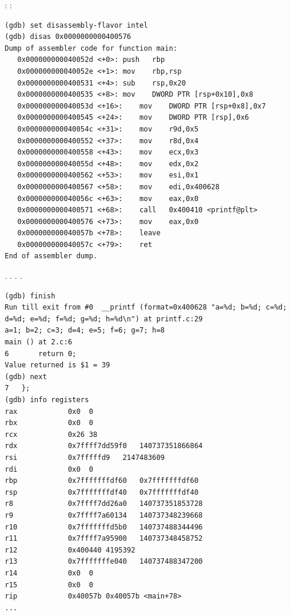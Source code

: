 %
:
:

\begin{lstlisting}
(gdb) set disassembly-flavor intel
(gdb) disas 0x0000000000400576
Dump of assembler code for function main:
   0x000000000040052d <+0>:	push   rbp
   0x000000000040052e <+1>:	mov    rbp,rsp
   0x0000000000400531 <+4>:	sub    rsp,0x20
   0x0000000000400535 <+8>:	mov    DWORD PTR [rsp+0x10],0x8
   0x000000000040053d <+16>:	mov    DWORD PTR [rsp+0x8],0x7
   0x0000000000400545 <+24>:	mov    DWORD PTR [rsp],0x6
   0x000000000040054c <+31>:	mov    r9d,0x5
   0x0000000000400552 <+37>:	mov    r8d,0x4
   0x0000000000400558 <+43>:	mov    ecx,0x3
   0x000000000040055d <+48>:	mov    edx,0x2
   0x0000000000400562 <+53>:	mov    esi,0x1
   0x0000000000400567 <+58>:	mov    edi,0x400628
   0x000000000040056c <+63>:	mov    eax,0x0
   0x0000000000400571 <+68>:	call   0x400410 <printf@plt>
   0x0000000000400576 <+73>:	mov    eax,0x0
   0x000000000040057b <+78>:	leave  
   0x000000000040057c <+79>:	ret    
End of assembler dump.
\end{lstlisting}

.
.
\RIP {} 
.
 .

\begin{lstlisting}
(gdb) finish
Run till exit from #0  __printf (format=0x400628 "a=%d; b=%d; c=%d; d=%d; e=%d; f=%d; g=%d; h=%d\n") at printf.c:29
a=1; b=2; c=3; d=4; e=5; f=6; g=7; h=8
main () at 2.c:6
6		return 0;
Value returned is $1 = 39
(gdb) next
7	};
(gdb) info registers
rax            0x0	0
rbx            0x0	0
rcx            0x26	38
rdx            0x7ffff7dd59f0	140737351866864
rsi            0x7fffffd9	2147483609
rdi            0x0	0
rbp            0x7fffffffdf60	0x7fffffffdf60
rsp            0x7fffffffdf40	0x7fffffffdf40
r8             0x7ffff7dd26a0	140737351853728
r9             0x7ffff7a60134	140737348239668
r10            0x7fffffffd5b0	140737488344496
r11            0x7ffff7a95900	140737348458752
r12            0x400440	4195392
r13            0x7fffffffe040	140737488347200
r14            0x0	0
r15            0x0	0
rip            0x40057b	0x40057b <main+78>
...
\end{lstlisting}
\fi
\fi
